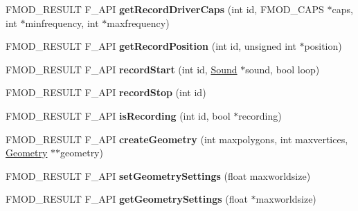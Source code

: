 \begin{DoxyCompactItemize}
\item 
F\+M\+O\+D\+\_\+\+R\+E\+S\+U\+LT F\+\_\+\+A\+PI {\bfseries get\+Record\+Driver\+Caps} (int id, F\+M\+O\+D\+\_\+\+C\+A\+PS $\ast$caps, int $\ast$minfrequency, int $\ast$maxfrequency)\hypertarget{class_f_m_o_d_1_1_system_ad5ee4d0a2a2b89ae66d3bbd7255e77a2}{}\label{class_f_m_o_d_1_1_system_ad5ee4d0a2a2b89ae66d3bbd7255e77a2}

\item 
F\+M\+O\+D\+\_\+\+R\+E\+S\+U\+LT F\+\_\+\+A\+PI {\bfseries get\+Record\+Position} (int id, unsigned int $\ast$position)\hypertarget{class_f_m_o_d_1_1_system_a508b2368e0c8d9d7d582b89e957c5b5b}{}\label{class_f_m_o_d_1_1_system_a508b2368e0c8d9d7d582b89e957c5b5b}

\item 
F\+M\+O\+D\+\_\+\+R\+E\+S\+U\+LT F\+\_\+\+A\+PI {\bfseries record\+Start} (int id, \hyperlink{class_f_m_o_d_1_1_sound}{Sound} $\ast$sound, bool loop)\hypertarget{class_f_m_o_d_1_1_system_a244b4cd7c917fa73354a0b1579003e15}{}\label{class_f_m_o_d_1_1_system_a244b4cd7c917fa73354a0b1579003e15}

\item 
F\+M\+O\+D\+\_\+\+R\+E\+S\+U\+LT F\+\_\+\+A\+PI {\bfseries record\+Stop} (int id)\hypertarget{class_f_m_o_d_1_1_system_a8fb57bf64f8e40ea7e0183cec6765c0f}{}\label{class_f_m_o_d_1_1_system_a8fb57bf64f8e40ea7e0183cec6765c0f}

\item 
F\+M\+O\+D\+\_\+\+R\+E\+S\+U\+LT F\+\_\+\+A\+PI {\bfseries is\+Recording} (int id, bool $\ast$recording)\hypertarget{class_f_m_o_d_1_1_system_a30d96283b97941279b8896a5993c6592}{}\label{class_f_m_o_d_1_1_system_a30d96283b97941279b8896a5993c6592}

\item 
F\+M\+O\+D\+\_\+\+R\+E\+S\+U\+LT F\+\_\+\+A\+PI {\bfseries create\+Geometry} (int maxpolygons, int maxvertices, \hyperlink{class_f_m_o_d_1_1_geometry}{Geometry} $\ast$$\ast$geometry)\hypertarget{class_f_m_o_d_1_1_system_a3652e6e628a0b634f3670d40fde05938}{}\label{class_f_m_o_d_1_1_system_a3652e6e628a0b634f3670d40fde05938}

\item 
F\+M\+O\+D\+\_\+\+R\+E\+S\+U\+LT F\+\_\+\+A\+PI {\bfseries set\+Geometry\+Settings} (float maxworldsize)\hypertarget{class_f_m_o_d_1_1_system_a421603edcdc170de9d72d8ab95ee0fbd}{}\label{class_f_m_o_d_1_1_system_a421603edcdc170de9d72d8ab95ee0fbd}

\item 
F\+M\+O\+D\+\_\+\+R\+E\+S\+U\+LT F\+\_\+\+A\+PI {\bfseries get\+Geometry\+Settings} (float $\ast$maxworldsize)\hypertarget{class_f_m_o_d_1_1_system_a4466ede69006041d702b6ac5be162c57}{}\label{class_f_m_o_d_1_1_system_a4466ede69006041d702b6ac5be162c57}


\end{DoxyCompactItemize}
